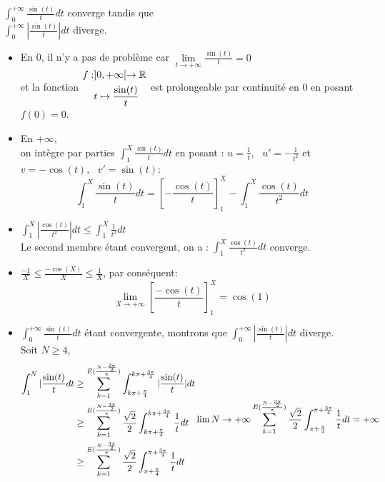 \documentclass[../main.tex]{subfile}
\begin{document}
\begin{ctex}
	$$\phantom{a}$$
	$\int_0^{+\infty} \frac{\sin(t)}{t} dt$ converge tandis que\\
	$\int_0^{+\infty} |\frac{\sin(t)}{t}| dt$ diverge.\\

	\begin{itemize}
		\item En 0, il n'y a pas de problème car $\lim\limits_{t \to +\infty} \frac{\sin(t)}{t} = 0$\\
		et la fonction $
		\begin{aligned}
			f:& ]0, + \infty[ \to \mathbb{R}\\
			&t \mapsto \frac{\sin(t)}{t}
		\end{aligned}
		$ est prolongeable par continuité en $0$ en posant $f(0) = 0$.\\

		\item En $+\infty$, \\
		on intègre par parties $\int_1^X \frac{\sin(t)}{t} dt$ en posant : $u = \frac{1}{t}, \ \ \ u' = - \frac{1}{t^2}$ et $v = - \cos(t), \ \ \ v'= \sin(t)$:\\
		$$\int_1^X \frac{\sin(t)}{t} dt = \left[ - \frac{\cos(t)}{t} \right]_1^X - \int_1^X \frac{\cos(t)}{t^2} dt$$

		\item $\int_1^X |\frac{\cos(t)}{t^2}| dt \leq \int_1^X \frac{1}{t^2} dt$\\
		Le second membre étant convergent, on a : $\int_1^X \frac{\cos(t)}{t^2} dt$ converge.

		\item $\frac{-1}{X} \leq \frac{- \cos(X)}{X} \leq \frac{1}{X}$, par conséquent:\\
		$$\lim\limits_{X \to +\infty} \left[ \frac{- \cos (t)}{t} \right]_1^X = \cos(1)$$

		\item $\int_0^{+\infty} \frac{\sin(t)}{t} dt$ étant convergente, 
		montrons que $\int_0^{+\infty} |\frac{\sin(t)}{t}| dt$ diverge.\\
		Soit $N \geq 4$, 
		$$
		\begin{aligned}
			\int_1^N |\frac{\sin(t)}{t} dt &\geq
			\sum\limits_{k=1}^{E(\frac{N - \frac{3\pi}{2}}{\pi})} \int_{k \pi + \frac{\pi}{4}}^{k \pi + \frac{3 \pi}{4}} |\frac{\sin(t)}{t}| dt\\
			&\geq \sum\limits_{k=1}^{E(\frac{N - \frac{3\pi}{2}}{\pi})} \frac{\sqrt{2}}{2} \int_{k \pi + \frac{\pi}{4}}^{k \pi + \frac{3 \pi}{4}} \frac{1}{t} dt\\
			&\geq \sum\limits_{k=1}^{E(\frac{N - \frac{3\pi}{2}}{\pi})} \frac{\sqrt{2}}{2} \int_{\pi + \frac{\pi}{4}}^{\pi + \frac{3 \pi}{4}} \frac{1}{t} dt\\
		\end{aligned}
			\lim\limits{N \to +\infty} \sum\limits_{k=1}^{E(\frac{N - \frac{3\pi}{2}}{\pi})} \frac{\sqrt{2}}{2} \int_{\pi + \frac{\pi}{4}}^{\pi + \frac{3 \pi}{4}} \frac{1}{t} dt = + \infty \\
		$$
	\end{itemize}
\end{ctex}
\end{document}

